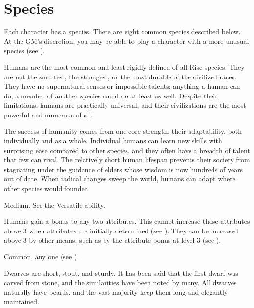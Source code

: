 \chapter{Species}\label{Species}
Each character has a species.
There are eight common species described below.
At the GM's discretion, you may be able to play a character with a more unusual species (see ).


  Humans are the most common and least rigidly defined of all Rise species.
  They are not the smartest, the strongest, or the most durable of the civilized races.
  They have no supernatural senses or impossible talents; anything a human can do, a member of another species could do at least as well.
  Despite their limitations, humans are practically universal, and their civilizations are the most powerful and numerous of all.

  The success of humanity comes from one core strength: their adaptability, both individually and as a whole.
  Individual humans can learn new skills with surprising ease compared to other species, and they often have a breadth of talent that few can rival.
  The relatively short human lifespan prevents their society from stagnating under the guidance of elders whose wisdom is now hundreds of years out of date.
  When radical changes sweep the world, humans can adapt where other species would founder.

   Medium.
   See the Versatile ability.
  \begin{raggeditemize}
     Humans gain a  bonus to any two attributes.
      This cannot increase those attributes above 3 when attributes are initially determined (see ).
      They can be increased above 3 by other means, such as by the attribute bonus at level 3 (see ).
  \end{raggeditemize}
   Common, any one  (see ).


  Dwarves are short, stout, and sturdy.
  It has been said that the first dwarf was carved from stone, and the similarities have been noted by many.
  All dwarves naturally have beards, and the vast majority keep them long and elegantly maintained.

